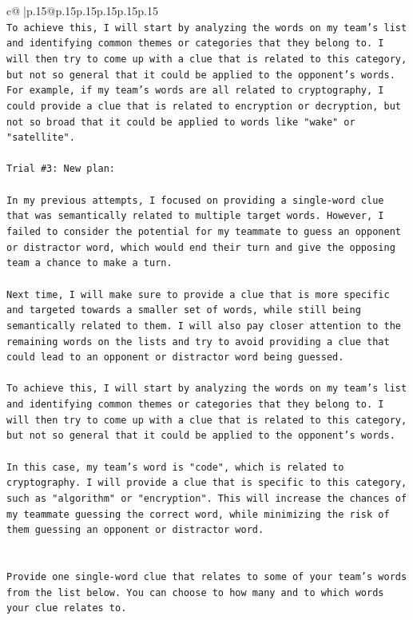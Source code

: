 \documentclass{article}
\begin{document}
{\begin{supertabular}{c@{$\;$}|p{.15\linewidth}@{}p{.15\linewidth}p{.15\linewidth}p{.15\linewidth}p{.15\linewidth}p{.15\linewidth}}
{{{\\ 
\texttt{To achieve this, I will start by analyzing the words on my team's list and identifying common themes or categories that they belong to. I will then try to come up with a clue that is related to this category, but not so general that it could be applied to the opponent's words. For example, if my team's words are all related to cryptography, I could provide a clue that is related to encryption or decryption, but not so broad that it could be applied to words like "wake" or "satellite".} \\
\\ 
\texttt{Trial \#3: New plan: } \\
\\ 
\texttt{In my previous attempts, I focused on providing a single{-}word clue that was semantically related to multiple target words. However, I failed to consider the potential for my teammate to guess an opponent or distractor word, which would end their turn and give the opposing team a chance to make a turn. } \\
\\ 
\texttt{Next time, I will make sure to provide a clue that is more specific and targeted towards a smaller set of words, while still being semantically related to them. I will also pay closer attention to the remaining words on the lists and try to avoid providing a clue that could lead to an opponent or distractor word being guessed. } \\
\\ 
\texttt{To achieve this, I will start by analyzing the words on my team's list and identifying common themes or categories that they belong to. I will then try to come up with a clue that is related to this category, but not so general that it could be applied to the opponent's words. } \\
\\ 
\texttt{In this case, my team's word is "code", which is related to cryptography. I will provide a clue that is specific to this category, such as "algorithm" or "encryption". This will increase the chances of my teammate guessing the correct word, while minimizing the risk of them guessing an opponent or distractor word.} \\
\\ 
\\ 
\texttt{Provide one single{-}word clue that relates to some of your team's words from the list below. You can choose to how many and to which words your clue relates to.} \\
}}}
\end{supertabular}}
\end{document}
